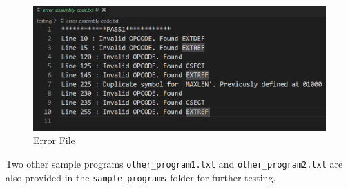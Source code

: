 \documentclass[
]{article}
\begin{document}
\begin{figure}[H]
\centering
\includegraphics{img/image-9.png}
\caption{Error File}
\end{figure}

Two other sample programs \texttt{other\_program1.txt} and
\texttt{other\_program2.txt} are also provided in the
\texttt{sample\_programs} folder for further testing.
\end{document}
